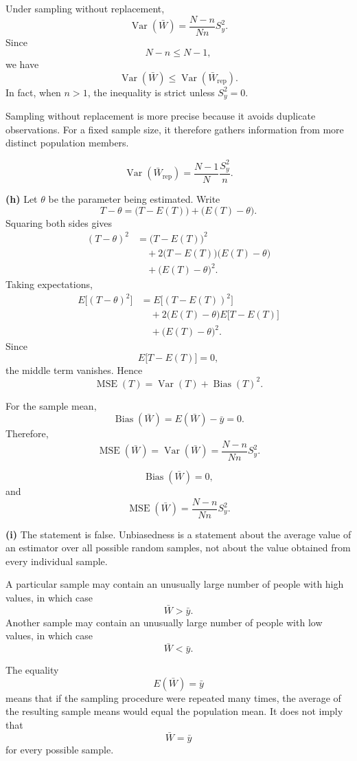\documentclass[11pt]{article}
\begin{document}
\begin{solutionbox}
Under sampling without replacement,
\[
\operatorname{Var}(\bar W)
=
\frac{N-n}{Nn}S_y^2.
\]
Since
\[
N-n\leq N-1,
\]
we have
\[
\operatorname{Var}(\bar W)
\leq
\operatorname{Var}(\bar W_{\mathrm{rep}}).
\]
In fact, when \(n>1\), the inequality is strict unless \(S_y^2=0\).

Sampling without replacement is more precise because it avoids duplicate
observations. For a fixed sample size, it therefore gathers information from
more distinct population members.

\begin{finalanswerbox}
\[
\operatorname{Var}(\bar W_{\mathrm{rep}})
=
\frac{N-1}{N}\frac{S_y^2}{n}.
\]
\end{finalanswerbox}

\medskip

\textbf{(h)}
Let \(\theta\) be the parameter being estimated. Write
\[
T-\theta
=
\bigl(T-E(T)\bigr)
+
\bigl(E(T)-\theta\bigr).
\]
Squaring both sides gives
\begin{align*}
(T-\theta)^2
&=
\bigl(T-E(T)\bigr)^2\\
&\quad
+
2\bigl(T-E(T)\bigr)\bigl(E(T)-\theta\bigr)\\
&\quad
+
\bigl(E(T)-\theta\bigr)^2.
\end{align*}
Taking expectations,
\begin{align*}
E\bigl[(T-\theta)^2\bigr]
&=
E\bigl[(T-E(T))^2\bigr]\\
&\quad
+
2\bigl(E(T)-\theta\bigr)
E\bigl[T-E(T)\bigr]\\
&\quad
+
\bigl(E(T)-\theta\bigr)^2.
\end{align*}
Since
\[
E\bigl[T-E(T)\bigr]=0,
\]
the middle term vanishes. Hence
\[
\operatorname{MSE}(T)
=
\operatorname{Var}(T)
+
\operatorname{Bias}(T)^2.
\]

For the sample mean,
\[
\operatorname{Bias}(\bar W)
=
E(\bar W)-\bar y
=
0.
\]
Therefore,
\[
\operatorname{MSE}(\bar W)
=
\operatorname{Var}(\bar W)
=
\frac{N-n}{Nn}S_y^2.
\]

\begin{finalanswerbox}
\[
\operatorname{Bias}(\bar W)=0,
\]
and
\[
\operatorname{MSE}(\bar W)
=
\frac{N-n}{Nn}S_y^2.
\]
\end{finalanswerbox}

\medskip

\textbf{(i)}
The statement is false. Unbiasedness is a statement about the average value of
an estimator over all possible random samples, not about the value obtained
from every individual sample.

A particular sample may contain an unusually large number of people with high
values, in which case
\[
\bar W>\bar y.
\]
Another sample may contain an unusually large number of people with low values,
in which case
\[
\bar W<\bar y.
\]

The equality
\[
E(\bar W)=\bar y
\]
means that if the sampling procedure were repeated many times, the average of
the resulting sample means would equal the population mean. It does not imply
that
\[
\bar W=\bar y
\]
for every possible sample.

\end{solutionbox}

 
 
\end{document}
